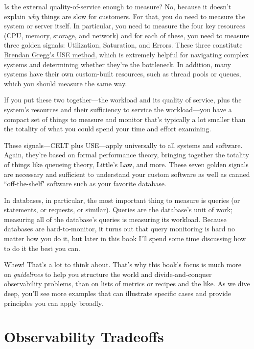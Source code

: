 \documentclass{vivid_layout}
\begin{document}
Is the external quality-of-service enough to measure? No, because it doesn't explain \emph{why} things are slow for customers. For that, you do need to measure the system or server itself. In particular, you need to measure the four key resources (CPU, memory, storage, and network) and for each of these, you need to measure three golden signals: Utilization, Saturation, and Errors. These three constitute \href{http://www.brendangregg.com/usemethod.html}{Brendan Gregg's USE method}, which is extremely helpful for navigating complex systems and determining whether they're the bottleneck. In addition, many systems have their own custom-built resources, such as thread pools or queues, which you should measure the same way.

If you put these two together---the workload and its quality of service, plus the system's resources and their sufficiency to service the workload---you have a compact set of things to measure and monitor that's typically a lot smaller than the totality of what you could spend your time and effort examining.

These signals---CELT plus USE---apply universally to all systems and software. Again, they're based on formal performance theory, bringing together the totality of things like queueing theory, Little's Law, and more. These seven golden signals are necessary and sufficient to understand your custom software as well as canned ``off-the-shelf" software such as your favorite database.

In databases, in particular, the most important thing to measure is queries (or
statements, or requests, or similar).  Queries are the database's unit of work; measuring all of the database's queries is measuring its workload. Because databases are hard-to-monitor, it turns out that query monitoring is hard no matter how you do it, but later in this book I'll spend some time discussing how to do it the best you can.

Whew! That's a lot to think about.
That's why this book's focus is much more on \emph{guidelines} to help you structure the world and divide-and-conquer observability problems, than on 
lists of metrics or recipes and the like. As we dive deep, you'll see
more examples that can illustrate specific cases and provide
principles you can apply broadly.

\section{Observability Tradeoffs}
\end{document}
